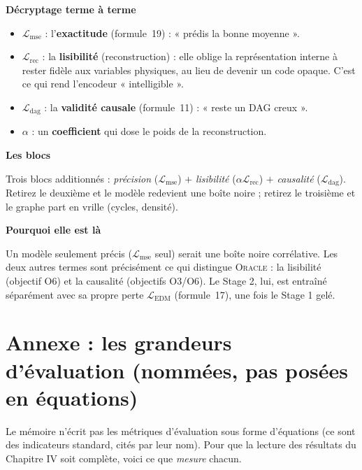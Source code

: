 \documentclass[11pt,a4paper]{article}
\newcommand{\Oracle}{\textsc{Oracle}}
\newcommand{\Lmse}{\ensuremath{\mathcal{L}_{\mathrm{mse}}}}
\newcommand{\Lrec}{\ensuremath{\mathcal{L}_{\mathrm{rec}}}}
\newcommand{\Ldag}{\ensuremath{\mathcal{L}_{\mathrm{dag}}}}
\newcommand{\LEDM}{\ensuremath{\mathcal{L}_{\mathrm{EDM}}}}
\newcommand{\bloc}[1]{\par\medskip\noindent\textcolor{accent}{\textbf{#1}}\par\nopagebreak\smallskip}
\begin{document}
\bloc{Décryptage terme à terme}
\begin{itemize}[nosep]
  \item $\Lmse$ : l'\textbf{exactitude} (formule~19) : « prédis la bonne moyenne ».
  \item $\Lrec$ : la \textbf{lisibilité} (reconstruction) : elle oblige la représentation interne à rester fidèle aux variables physiques, au lieu de devenir un code opaque. C'est ce qui rend l'encodeur « intelligible ».
  \item $\Ldag$ : la \textbf{validité causale} (formule~11) : « reste un DAG creux ».
  \item $\alpha$ : un \textbf{coefficient} qui dose le poids de la reconstruction.
\end{itemize}

\bloc{Les blocs}
Trois blocs additionnés : \emph{précision} ($\Lmse$) $+$ \emph{lisibilité} ($\alpha\Lrec$) $+$ \emph{causalité} ($\Ldag$). Retirez le deuxième et le modèle redevient une boîte noire ; retirez le troisième et le graphe part en vrille (cycles, densité).

\bloc{Pourquoi elle est là}
Un modèle seulement précis ($\Lmse$ seul) serait une boîte noire corrélative. Les deux autres termes sont précisément ce qui distingue \Oracle{} : la lisibilité (objectif O6) et la causalité (objectifs O3/O6). Le Stage 2, lui, est entraîné séparément avec sa propre perte $\LEDM$ (formule~17), une fois le Stage 1 gelé.

\section{Annexe : les grandeurs d'évaluation (nommées, pas posées en équations)}

\begin{mdframed}[backgroundcolor=grisclair,linecolor=vert,linewidth=0.6pt,roundcorner=3pt]
Le mémoire n'écrit pas les métriques d'évaluation sous forme d'équations (ce sont des indicateurs standard, cités par leur nom). Pour que la lecture des résultats du Chapitre IV soit complète, voici ce que \emph{mesure} chacun.
\end{mdframed}
\end{document}

